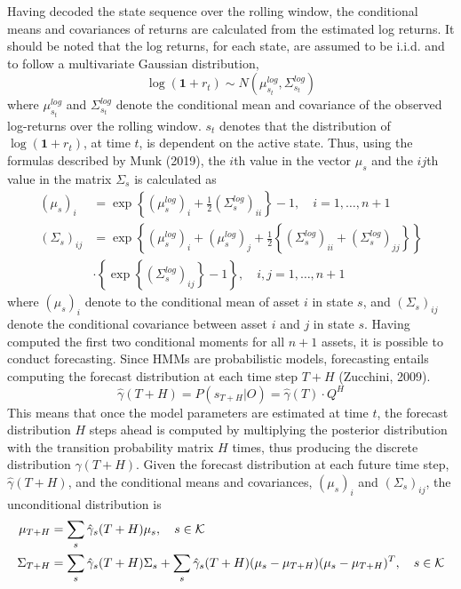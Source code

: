 Having decoded the state sequence over the rolling window, the conditional means and covariances of returns are calculated from the estimated log returns. It should be noted that the log returns, for each state, are assumed to be i.i.d. and to follow a multivariate Gaussian distribution,
\begin{equation}
    \log(\mathbf{1}+ r_t) \sim N\left(\mu_{s_t}^{log}, \Sigma_{s_t}^{log}  \right)
\end{equation}
where $\mu_{s_t}^{log}$ and $\Sigma_{s_t}^{log}$ denote the conditional mean and covariance of the observed log-returns over the rolling window. $s_t$ denotes that the distribution of $\log(\mathbf{1}+ r_t)$, at time $t$, is dependent on the active state. Thus, using the formulas described by Munk (2019), the $i$th value in the vector $\mu_s$ and the $ij$th value in the matrix $\Sigma_s$ is calculated as
\begin{align}
    (\mu_{s})_i &= \exp \left\{(\mu_{s}^{log})_i + \frac{1}{2}(\Sigma_{s}^{log})_{ii} \right\} - 1,
    \quad i = 1,\ldots, n+1
    \\
    (\Sigma_{s})_{ij} &= \exp \left\{(\mu_{s}^{log})_i + (\mu_{s}^{log})_j + \frac{1}{2}\left\{(\Sigma_{s}^{log})_{ii} + (\Sigma_{s}^{log})_{jj} \right\} \right\} \\
    &\cdot \left\{ \exp \left\{ (\Sigma_{s}^{log})_{ij} \right\} - 1 \right\} \nonumber
    , \quad i,j = 1,\ldots,n+1
\end{align}
where $(\mu_{s})_i$ denote to the conditional mean of asset $i$ in state $s$, and $(\Sigma_{s})_{ij}$ denote the conditional covariance between asset $i$ and $j$ in state $s$. Having computed the first two conditional moments for all $n+1$ assets, it is possible to conduct forecasting. Since HMMs are probabilistic models, forecasting entails computing the forecast distribution at each time step $T+H$ (Zucchini, 2009).
\begin{equation}
    \hat\gamma(T+H) = P(s_{T+H}| O) = \hat\gamma(T) \cdot Q^H
\end{equation}
This means that once the model parameters are estimated at time $t$, the forecast distribution $H$ steps ahead is computed by multiplying the posterior distribution with the transition probability matrix $H$ times, thus producing the discrete distribution $\hat\gamma(T+H)$. Given the forecast distribution at each future time step, $\hat\gamma(T+H)$, and the conditional means and covariances, $(\mu_{s})_i$ and $(\Sigma_{s})_{ij}$, the unconditional distribution is
\begin{align}
    \mu_{T+H} &= \sum_s \hat\gamma_s(T+H) \mu_s,
    \quad s \in\operatorname{\mathcal{K}} \label{eq:MPC_mean_uncond} \\
    \Sigma_{T+H} &= \sum_s \hat\gamma_s(T+H) \Sigma_s + \sum_s \hat\gamma_s(T+H) (\mu_s-\mu_{T+H})(\mu_s-\mu_{T+H})^T ,
    \quad s\in\operatorname{\mathcal{K}}  \label{eq:MPC_var_uncond}
\end{align}
